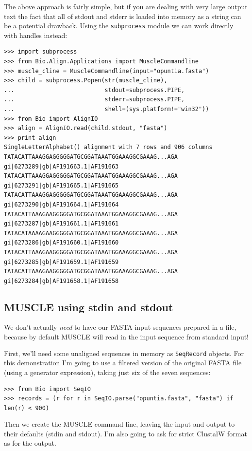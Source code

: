 \documentclass{report}
\begin{document}
The above approach is fairly simple, but if you are dealing with very large output
text the fact that all of stdout and stderr is loaded into memory as a string can
be a potential drawback. Using the \verb|subprocess| module we can work directly
with handles instead:

\begin{verbatim}
>>> import subprocess
>>> from Bio.Align.Applications import MuscleCommandline
>>> muscle_cline = MuscleCommandline(input="opuntia.fasta")
>>> child = subprocess.Popen(str(muscle_cline),
...                          stdout=subprocess.PIPE,
...                          stderr=subprocess.PIPE,
...                          shell=(sys.platform!="win32"))
>>> from Bio import AlignIO
>>> align = AlignIO.read(child.stdout, "fasta")
>>> print align
SingleLetterAlphabet() alignment with 7 rows and 906 columns
TATACATTAAAGGAGGGGGATGCGGATAAATGGAAAGGCGAAAG...AGA gi|6273289|gb|AF191663.1|AF191663
TATACATTAAAGGAGGGGGATGCGGATAAATGGAAAGGCGAAAG...AGA gi|6273291|gb|AF191665.1|AF191665
TATACATTAAAGGAGGGGGATGCGGATAAATGGAAAGGCGAAAG...AGA gi|6273290|gb|AF191664.1|AF191664
TATACATTAAAGAAGGGGGATGCGGATAAATGGAAAGGCGAAAG...AGA gi|6273287|gb|AF191661.1|AF191661
TATACATAAAAGAAGGGGGATGCGGATAAATGGAAAGGCGAAAG...AGA gi|6273286|gb|AF191660.1|AF191660
TATACATTAAAGAAGGGGGATGCGGATAAATGGAAAGGCGAAAG...AGA gi|6273285|gb|AF191659.1|AF191659
TATACATTAAAGAAGGGGGATGCGGATAAATGGAAAGGCGAAAG...AGA gi|6273284|gb|AF191658.1|AF191658
\end{verbatim}

\subsection{MUSCLE using stdin and stdout}

We don't actually \emph{need} to have our FASTA input sequences prepared in a file,
because by default MUSCLE will read in the input sequence from standard input!

First, we'll need some unaligned sequences in memory as \verb|SeqRecord| objects.
For this demonstration I'm going to use a filtered version of the original FASTA
file (using a generator expression), taking just six of the seven sequences:

\begin{verbatim}
>>> from Bio import SeqIO
>>> records = (r for r in SeqIO.parse("opuntia.fasta", "fasta") if len(r) < 900)
\end{verbatim}

Then we create the MUSCLE command line, leaving the input and output to their
defaults (stdin and stdout). I'm also going to ask for strict ClustalW format
as for the output.
\end{document}
